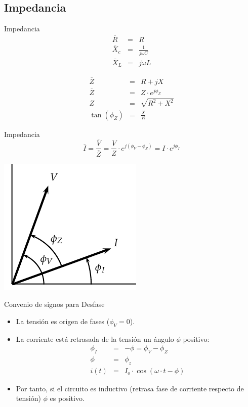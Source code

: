 \documentclass[xcolor={usenames,svgnames,dvipsnames}]{beamer}
\begin{document}
\subsection{Impedancia}
\label{sec:org3cc1ff8}
\begin{frame}[label={sec:org76e9e8b}]{Impedancia}
$$\begin{aligned}
  \overline{R} & = & R\\
  \overline{X}_{c} & = & \frac{1}{j\omega C}\\
  \overline{X}_{L} & = & j\omega L
\end{aligned}$$

$$\begin{aligned}
  \overline{Z} & = & R+jX\\
  \overline{Z} & = & Z\cdot e^{j\phi_{Z}}\\
  Z & = & \sqrt{R^{2}+X^{2}}\\
  \tan(\phi_{Z}) & = & \frac{X}{R}
\end{aligned}$$
\end{frame}

\begin{frame}[label={sec:org9672d76}]{Impedancia}
$$\overline{I}=\frac{\overline{V}}{\overline{Z}}=\frac{V}{Z}\cdot
e^{j(\phi_{V}-\phi_{Z})}=I\cdot e^{j\phi_{I}}$$
\begin{center}
\includegraphics[height=0.4\textheight]{../figs/Impedancia.pdf}
\end{center}
\end{frame}

\begin{frame}[label={sec:org963cd3d}]{Convenio de signos para Desfase}
\begin{itemize}
\item La tensión es origen de fases (\(\phi_{V}=0\)).

\item La corriente está retrasada de la tensión un ángulo \(\phi\) positivo:
$$\begin{aligned}
         \phi_{I} & = & -\phi=\phi_{V}-\phi_{Z}\\
         \phi & = & \phi_{z}\\
         i(t) & = & I_{o}\cdot\cos(\omega\cdot t-\phi)
       \end{aligned}$$

\item Por tanto, \alert{si el circuito es inductivo (retrasa fase de corriente
respecto de tensión) \(\phi\) es positivo}.
\end{itemize}
\end{frame}
\end{document}
